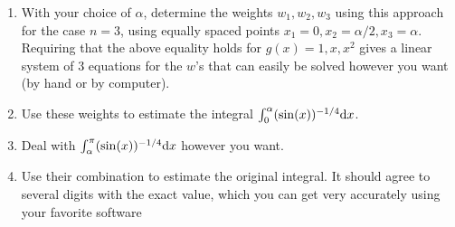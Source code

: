 \documentclass[10pt]{article}
\begin{document}
\begin{problem}
    \begin{enumerate}[label=(\alph*), nolistsep]
        \item With your choice of \( \alpha \), determine the weights \( w_1, w_2, w_3 \) using this approach for the case \( n = 3 \), using equally spaced points \( x_1 = 0, x_2 = \alpha/2, x_3 = \alpha \). Requiring that the above equality holds for \( g(x) = 1, x, x^2 \) gives a linear system of 3 equations for the \( w \)'s that can easily be solved however you want (by hand or by computer).
        \item Use these weights to estimate the integral \( \int_0^\alpha (\sin(x))^{-1/4}\mathrm{d} x \).
        \item  Deal with \( \int_{\alpha}^\pi (\sin(x))^{-1/4}\mathrm{d} x \) however you want.
        \item Use their combination to estimate the original integral. It should agree to several digits with the exact value, which you can get very accurately using your favorite software
    \end{enumerate}
\end{problem}
\end{document}
